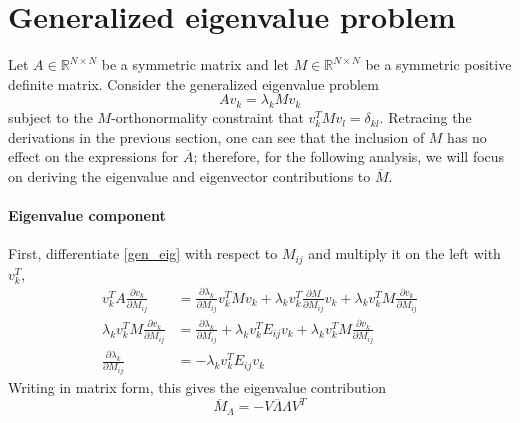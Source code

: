 \documentclass[11pt, a4paper]{article}
\begin{document}
\section{Generalized eigenvalue problem}
\label{gep}

Let $A\in\mathbb R^{N\times N}$ be a symmetric matrix and let $M\in\mathbb R^{N\times N}$ be a symmetric positive definite matrix. Consider the generalized eigenvalue problem
\begin{equation}
    Av_k=\lambda_k Mv_k
    \label{gen_eig}
\end{equation}
subject to the $M$-orthonormality constraint that $v_k^TMv_l=\delta_{kl}$. Retracing the derivations in the previous section, one can see that the inclusion of $M$ has no effect on the expressions for $\overline A$; therefore, for the following analysis, we will focus on deriving the eigenvalue and eigenvector contributions to $\overline M$.

\paragraph{Eigenvalue component}
First, differentiate \eqref{gen_eig} with respect to $M_{ij}$ and multiply it on the left with $v_k^T$,
\begin{align}
    v_k^TA\frac{\partial v_k}{\partial M_{ij}} & = \frac{\partial \lambda_k}{\partial M_{ij}}v_k^TMv_k + \lambda_kv_k^T\frac{\partial M}{\partial M_{ij}}v_k + \lambda_kv_k^TM\frac{\partial v_k}{\partial M_{ij}} \\
    \lambda_k v_k^TM\frac{\partial v_k}{\partial M_{ij}} & = \frac{\partial \lambda_k}{\partial M_{ij}} + \lambda_k v_k^TE_{ij}v_k + \lambda_kv_k^TM\frac{\partial v_k}{\partial M_{ij}} \\
    \frac{\partial \lambda_k}{\partial M_{ij}} & = -\lambda_kv_k^TE_{ij}v_k
\end{align}
Writing in matrix form, this gives the eigenvalue contribution
\begin{equation}
\boxed{
    \overline{M}_\Lambda = -V\overline\Lambda\Lambda V^T
    \label{dLdM_via_eigenvalues}
}
\end{equation}
\end{document}

